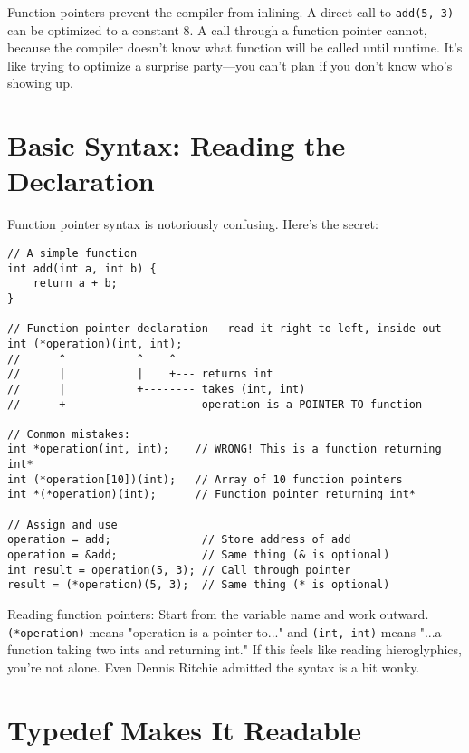\begin{notebox}
Function pointers prevent the compiler from inlining. A direct call to \texttt{add(5, 3)} can be optimized to a constant 8. A call through a function pointer cannot, because the compiler doesn't know what function will be called until runtime. It's like trying to optimize a surprise party---you can't plan if you don't know who's showing up.
\end{notebox}

\section{Basic Syntax: Reading the Declaration}

Function pointer syntax is notoriously confusing. Here's the secret:

\begin{lstlisting}
// A simple function
int add(int a, int b) {
    return a + b;
}

// Function pointer declaration - read it right-to-left, inside-out
int (*operation)(int, int);
//      ^           ^    ^
//      |           |    +--- returns int
//      |           +-------- takes (int, int)
//      +-------------------- operation is a POINTER TO function

// Common mistakes:
int *operation(int, int);    // WRONG! This is a function returning int*
int (*operation[10])(int);   // Array of 10 function pointers
int *(*operation)(int);      // Function pointer returning int*

// Assign and use
operation = add;              // Store address of add
operation = &add;             // Same thing (& is optional)
int result = operation(5, 3); // Call through pointer
result = (*operation)(5, 3);  // Same thing (* is optional)
\end{lstlisting}

\begin{notebox}
Reading function pointers: Start from the variable name and work outward. \texttt{(*operation)} means "operation is a pointer to..." and \texttt{(int, int)} means "...a function taking two ints and returning int." If this feels like reading hieroglyphics, you're not alone. Even Dennis Ritchie admitted the syntax is a bit wonky.
\end{notebox}

\section{Typedef Makes It Readable}

